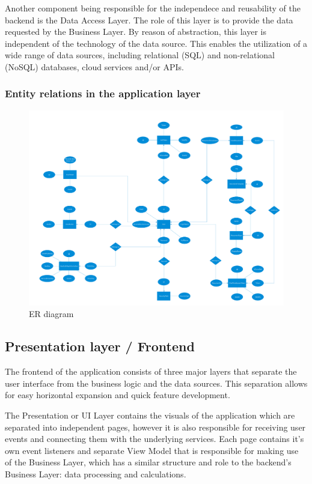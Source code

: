Another component being responsible for the independece and reusability of the backend is the Data Access Layer. 
The role of this layer is to provide the data requested by the Business Layer. 
By reason of abstraction, this layer is independent of the technology of the data source. 
This enables the utilization of a wide range of data sources, including relational (SQL) and non-relational (NoSQL) databases, cloud services and/or APIs.

\subsubsection{Entity relations in the application layer}


\begin{figure}[H]
	\centering
	\includegraphics[scale=0.29]{entity-relationship-diagram}
	\caption{ER diagram}
\end{figure}

\subsection{Presentation layer / Frontend}

The frontend of the application consists of three major layers that separate the user interface from the business logic and the data sources.
This separation allows for easy horizontal expansion and quick feature development.

The Presentation or UI Layer contains the visuals of the application which are separated into independent pages, however it is also responsible for receiving
user events and connecting them with the underlying services.
Each page contains it's own event listeners and separate View Model that is responsible for making use of the Business Layer,
which has a similar structure and role to the backend's Business Layer: data processing and calculations.


